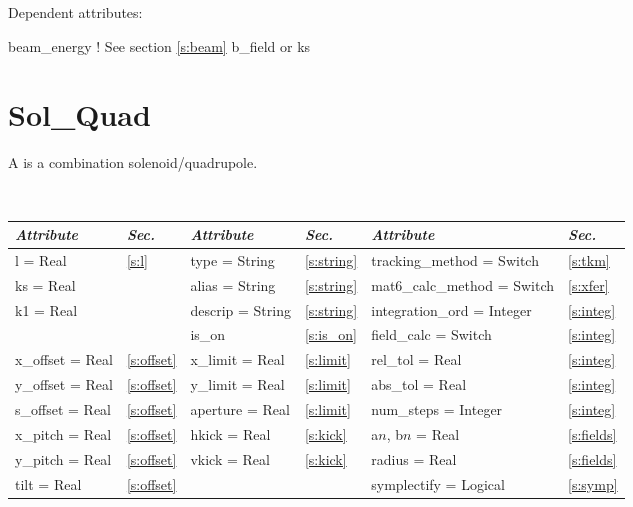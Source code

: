 \vskip0.05in \noindent
Dependent attributes:
\begin{example}
  beam\_energy  ! See section \ref{s:beam}
  b\_field or ks
\end{example}

\section{Sol\_Quad}
\label{s:sq}

A  is a combination solenoid/quadrupole.

\toffset
\begin{center}
\tt
\begin{tabular}{|l|l||l|l||l|l|} \hline
  {\sl Attribute} & {\sl Sec.}  & {\sl Attribute} & {\sl Sec.} & {\sl Attribute} & {\sl Sec.} \\ \hline
  l        = Real       & \ref{s:l}      & type = String      & \ref{s:string} & tracking\_method = Switch   & \ref{s:tkm}   \\ \hline
  ks       = Real       &                & alias = String     & \ref{s:string} & mat6\_calc\_method = Switch & \ref{s:xfer}  \\ \hline
  k1       = Real       &                & descrip = String   & \ref{s:string} & integration\_ord = Integer  & \ref{s:integ} \\ \hline
                        &                & is\_on             & \ref{s:is_on}  & field\_calc = Switch        & \ref{s:integ} \\ \hline
  x\_offset  = Real     & \ref{s:offset} & x\_limit = Real    & \ref{s:limit}  & rel\_tol = Real             & \ref{s:integ} \\ \hline
  y\_offset  = Real     & \ref{s:offset} & y\_limit = Real    & \ref{s:limit}  & abs\_tol = Real             & \ref{s:integ} \\ \hline
  s\_offset  = Real     & \ref{s:offset} & aperture = Real    & \ref{s:limit}  & num\_steps = Integer        & \ref{s:integ} \\ \hline
  x\_pitch = Real       & \ref{s:offset} & hkick    = Real    & \ref{s:kick}   & a$n$, b$n$ = Real           & \ref{s:fields}\\ \hline
  y\_pitch = Real       & \ref{s:offset} & vkick    = Real    & \ref{s:kick}   & radius = Real               & \ref{s:fields}\\ \hline
  tilt     = Real       & \ref{s:offset} &                    &                & symplectify = Logical       & \ref{s:symp}  \\ \hline
\end{tabular}
\end{center}
\toffset

